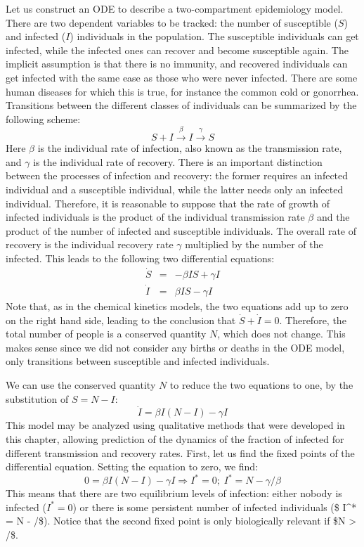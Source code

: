 \documentclass[
]{book}
\theoremstyle{definition}
\theoremstyle{definition}
\theoremstyle{definition}
\theoremstyle{remark}
\begin{document}
Let us construct an ODE to describe a two-compartment epidemiology model. There are two dependent variables to be tracked: the number of susceptible (\(S\)) and infected (\(I\)) individuals in the population. The susceptible individuals can get infected, while the infected ones can recover and become susceptible again. The implicit assumption is that there is no immunity, and recovered individuals can get infected with the same ease as those who were never infected. There are some human diseases for which this is true, for instance the common cold or gonorrhea. Transitions between the different classes of individuals can be summarized by the following scheme:
\[ S + I \xrightarrow{\beta} I \xrightarrow{\gamma} S \]
Here \(\beta\) is the individual rate of infection, also known as the transmission rate, and \(\gamma\) is the individual rate of recovery. There is an important distinction between the processes of infection and recovery: the former requires an infected individual and a susceptible individual, while the latter needs only an infected individual. Therefore, it is reasonable to suppose that the rate of growth of infected individuals is the product of the individual transmission rate \(\beta\) and the product of the number of infected and susceptible individuals. The overall rate of recovery is the individual recovery rate \(\gamma\) multiplied by the number of the infected. This leads to the following two differential equations:
\begin{eqnarray*}
\dot S &=& -\beta IS + \gamma I \\
\dot I & = &\beta I S - \gamma I
\end{eqnarray*}
Note that, as in the chemical kinetics models, the two equations add up to zero on the right hand side, leading to the conclusion that \(\dot S + \dot I = 0\). Therefore, the total number of people is a conserved quantity \(N\), which does not change. This makes sense since we did not consider any births or deaths in the ODE model, only transitions between susceptible and infected individuals.

We can use the conserved quantity \(N\) to reduce the two equations to one, by the substitution of \(S = N -I\):
\[  \dot I  =  \beta I (N - I) - \gamma I \]
This model may be analyzed using qualitative methods that were developed in this chapter, allowing prediction of the dynamics of the fraction of infected for different transmission and recovery rates. First, let us find the fixed points of the differential equation. Setting the equation to zero, we find:
\[ 0  =  \beta I (N - I) - \gamma I \Rightarrow I^* = 0; \; I^* =  N - \gamma/\beta \]
This means that there are two equilibrium levels of infection: either nobody is infected (\(I^* = 0\)) or there is some persistent number of infected individuals (\$ I\^{}* = N - \gamma/\beta \$). Notice that the second fixed point is only biologically relevant if \$N \textgreater{} \gamma/\beta \$.
\end{document}
